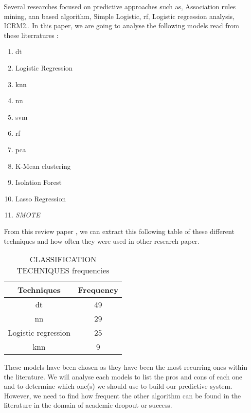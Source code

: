\documentclass[../../main.tex]{subfiles}
\begin{document}
Several researches focused on predictive approaches such as, Association rules mining, \acrfull{ann} based algorithm, Simple Logistic, 
\acrfull{rf}, Logistic regression analysis, ICRM2.\cite{mduma_survey_2019}. 
In this paper, we are going to analyse the following models read from these literratures \cite{mduma_survey_2019,quinlan_induction_1986,yadav_mining_2012,heredia_student_2015,ramirez_prediction_2018,cox_regression_1958,perez_modelo_2018,pandey_data_2011,cover_nearest_1967,mardolkar_forecasting_2020,zhang_neural_2000,rudin_stop_2019,siri_predicting_2015,m_alban_she_is_with_the_faculty_of_engineering_and_applied_sciences_of_the_technical_university_cotopaxi_neural_2019,boser_training_1992,lee_machine_2019,behr_early_2020,friedman_stochastic_2002,eckert_analysis_2015,tenpipat_student_2020,liang_machine_2016,liang_big_2016,fischer_angulo_modelo_2012,miranda_analysis_2017,viloria_integration_2019,kemper_predicting_2020,agrusti_university_2019}:
\begin{enumerate}
\item \acrfull{dt}
\item Logistic Regression
\item \acrfull{knn}
\item \acrfull{nn}
\item \acrfull{svm}
\item \acrfull{rf}
\item \acrfull{pca}
\item K-Mean clustering
\item Isolation Forest
\item Lasso Regression
\item \textit{SMOTE}
\end{enumerate}

From this review paper \cite{agrusti_university_2019}, we can extract this following table of these different techniques and how often they were used in other research paper.
\begin{table}[H]
    \centering
    \caption{CLASSIFICATION TECHNIQUES frequencies\cite{agrusti_university_2019}}
    \begin{tabular}{|c|c|}
        \hline
        \textbf{Techniques} & \textbf{Frequency}\\
        \hline
        \acrlong{dt} & 49\\
        \hline
        \acrlong{nn} & 29\\
        \hline
        Logistic regression & 25\\
        \hline
        \acrshort{knn} & 9\\
        \hline
    \end{tabular}
    \label{tab:class_tech_freq_agrusti}
\end{table}
These models have been chosen as they have been the most recurring ones within the literature. We will analyse each models to list the pros and cons of each one and to determine which one(s) we should use to build our predictive system.
However, we need to find how frequent the other algorithm can be found in the literature in the domain of academic dropout or success.
\end{document}
